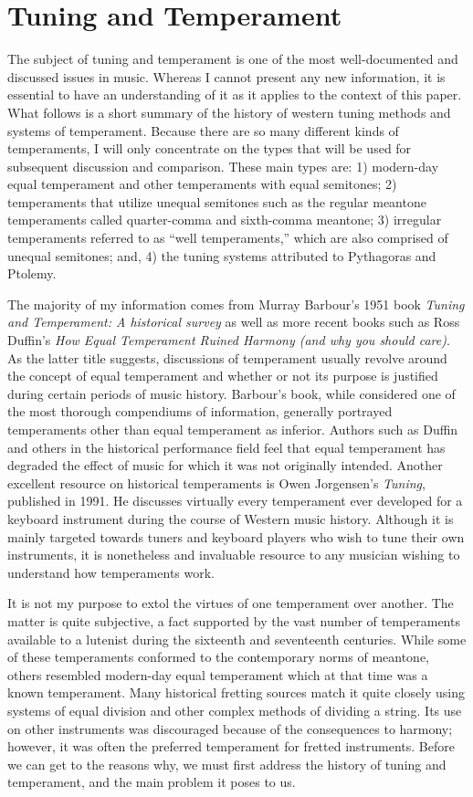 \chapter{Tuning and Temperament}

The subject of tuning and temperament is one of the most well-documented and discussed issues in music.
Whereas I cannot present any new information, it is essential to have an understanding
of it as it applies to the context of this paper. What follows is a short summary
of the history of western tuning methods and systems of temperament.  Because there are so
many different kinds of temperaments, I will only concentrate on the types that will be
used for subsequent discussion and comparison.  These main types are: 1) modern-day equal
temperament and other temperaments with equal semitones; 2) temperaments that utilize
unequal semitones such as the regular meantone temperaments called quarter-comma and
sixth-comma meantone; 3) irregular temperaments referred to as ``well temperaments,'' which 
are also comprised of unequal semitones; and, 4) the tuning systems attributed to
Pythagoras and Ptolemy.

The majority of my information comes from Murray Barbour's 1951 book \textit{Tuning and Temperament:
A historical survey} as well as more recent books such as Ross Duffin's \textit{How Equal
Temperament Ruined Harmony (and why you should care)}.  As the latter title suggests, discussions of
temperament usually revolve around the concept of equal temperament and whether or not its purpose
is justified during certain periods of music history.  Barbour's book, while considered one of the
most thorough compendiums of information, generally portrayed temperaments other than equal
temperament as inferior. Authors such as Duffin and others in the historical performance field feel
that equal temperament has degraded the effect of music for which it was not originally intended.
Another excellent resource on historical temperaments is Owen Jorgensen's \textit{Tuning}, published
in 1991.  He discusses virtually every temperament ever developed for a keyboard instrument during
the course of Western music history.  Although it is mainly targeted towards tuners and keyboard
players who wish to tune their own instruments, it is nonetheless and invaluable resource to any
musician wishing to understand how temperaments work.

It is not my purpose to extol the virtues of one temperament over another.  The matter is quite
subjective, a fact supported by the vast number of temperaments available to a lutenist during the
sixteenth and seventeenth centuries.  While some of these temperaments conformed to the contemporary
norms of meantone, others resembled modern-day equal temperament which at that time was a known
temperament. Many historical fretting sources match it quite closely using systems of equal division
and other complex methods of dividing a string.  Its use on other instruments was discouraged
because of the consequences to harmony; however, it was often the preferred temperament for fretted
instruments.  Before we can get to the reasons why, we must first address the history of tuning and
temperament, and the main problem it poses to us.

